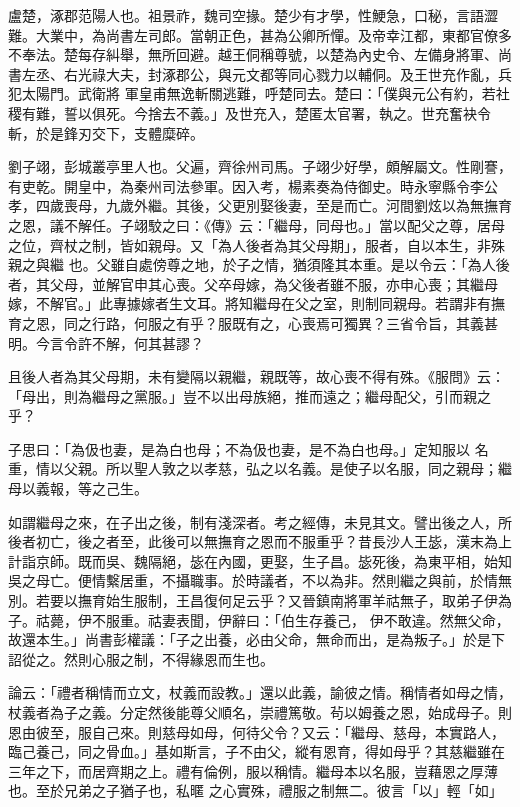 \begin{pinyinscope}
 盧楚，涿郡范陽人也。祖景祚，魏司空掾。楚少有才學，性鯁急，口秘，言語澀難。大業中，為尚書左司郎。當朝正色，甚為公卿所憚。及帝幸江都，東都官僚多不奉法。楚每存糾舉，無所回避。越王侗稱尊號，以楚為內史令、左備身將軍、尚書左丞、右光祿大夫，封涿郡公，與元文都等同心戮力以輔侗。及王世充作亂，兵犯太陽門。武衛將
 軍皇甫無逸斬關逃難，呼楚同去。楚曰：「僕與元公有約，若社稷有難，誓以俱死。今捨去不義。」及世充入，楚匿太官署，執之。世充奮袂令斬，於是鋒刃交下，支體糜碎。



 劉子翊，彭城叢亭里人也。父遍，齊徐州司馬。子翊少好學，頗解屬文。性剛謇，有吏乾。開皇中，為秦州司法參軍。因入考，楊素奏為侍御史。時永寧縣令李公孝，四歲喪母，九歲外繼。其後，父更別娶後妻，至是而亡。河間劉炫以為無撫育之恩，議不解任。子翊駮之曰：《傳》云：「繼母，同母也。」當以配父之尊，居母之位，齊杖之制，皆如親母。又「為人後者為其父母期」，服者，自以本生，非殊親之與繼
 也。父雖自處傍尊之地，於子之情，猶須隆其本重。是以令云：「為人後者，其父母，並解官申其心喪。父卒母嫁，為父後者雖不服，亦申心喪；其繼母嫁，不解官。」此專據嫁者生文耳。將知繼母在父之室，則制同親母。若謂非有撫育之恩，同之行路，何服之有乎？服既有之，心喪焉可獨異？三省令旨，其義甚明。今言令許不解，何其甚謬？



 且後人者為其父母期，未有變隔以親繼，親既等，故心喪不得有殊。《服問》云：「母出，則為繼母之黨服。」豈不以出母族絕，推而遠之；繼母配父，引而親之乎？



 子思曰：「為伋也妻，是為白也母；不為伋也妻，是不為白也母。」定知服以
 名重，情以父親。所以聖人敦之以孝慈，弘之以名義。是使子以名服，同之親母；繼母以義報，等之己生。



 如謂繼母之來，在子出之後，制有淺深者。考之經傳，未見其文。譬出後之人，所後者初亡，後之者至，此後可以無撫育之恩而不服重乎？昔長沙人王毖，漢末為上計詣京師。既而吳、魏隔絕，毖在內國，更娶，生子昌。毖死後，為東平相，始知吳之母亡。便情繫居重，不攝職事。於時議者，不以為非。然則繼之與前，於情無別。若要以撫育始生服制，王昌復何足云乎？又晉鎮南將軍羊祜無子，取弟子伊為子。祜薨，伊不服重。祜妻表聞，伊辭曰：「伯生存養己，
 伊不敢違。然無父命，故還本生。」尚書彭權議：「子之出養，必由父命，無命而出，是為叛子。」於是下詔從之。然則心服之制，不得緣恩而生也。



 論云：「禮者稱情而立文，杖義而設教。」還以此義，諭彼之情。稱情者如母之情，杖義者為子之義。分定然後能尊父順名，崇禮篤敬。茍以姆養之恩，始成母子。則恩由彼至，服自己來。則慈母如母，何待父令？又云：「繼母、慈母，本實路人，臨己養己，同之骨血。」基如斯言，子不由父，縱有恩育，得如母乎？其慈繼雖在三年之下，而居齊期之上。禮有倫例，服以稱情。繼母本以名服，豈藉恩之厚薄也。至於兄弟之子猶子也，私暱
 之心實殊，禮服之制無二。彼言「以」輕「如」




\end{pinyinscope}
